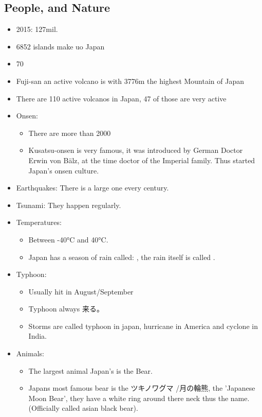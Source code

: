 \documentclass{article}
\begin{document}
\subsection{People, and Nature}
\begin{itemize}
\item {} 2015: 127mil. 
\item 6852 islands make uo Japan
\item 70%
\item Fuji-san an active volcano is with 3776m the highest Mountain of Japan
\item There are 110 active volcanos in Japan, 47 of those are very active
\item Onsen:
\begin{itemize}
\item There are more than 2000
\item Kusatsu-onsen is very famous, it was introduced by German Doctor Erwin von Bälz, at the time doctor of the Imperial family. Thus started Japan's onsen culture. 
\end{itemize}
\item Earthquakes: There is a large one every century.
\item Tsunami: They happen regularly.
\item Temperatures:
\begin{itemize}
\item Between -40°C and 40°C.
\item Japan has a season of rain called: , the rain itself is called . 
\end{itemize}
\item Typhoon:
\begin{itemize}
\item Usually hit in August/September
\item Typhoon always 来る。
\item Storms are called typhoon in japan, hurricane in America and cyclone in India.
\end{itemize}
\item Animals:
\begin{itemize}
\item The largest animal Japan's is the Bear.
\item Japans most famous bear is the ツキノワグマ /月の輪熊, the 'Japanese Moon Bear', they have a white ring around there neck thus the name. (Officially called asian black bear).

\end{itemize}
\end{itemize}
\end{document}

